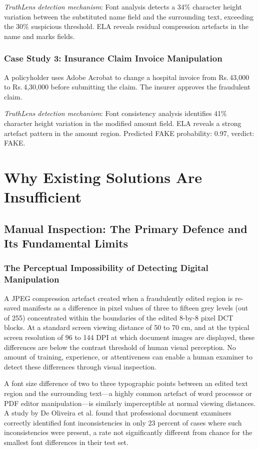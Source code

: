 \documentclass[12pt,a4paper,oneside]{report}
\newcommand{\rupee}{Rs.\,}
\begin{document}
\textit{TruthLens detection mechanism}: Font analysis detects a 34\% character
height variation between the substituted name field and the surrounding text,
exceeding the 30\% suspicious threshold. ELA reveals residual compression
artefacts in the name and marks fields.

\subsubsection*{Case Study 3: Insurance Claim Invoice Manipulation}

A policyholder uses Adobe Acrobat to change a hospital invoice from
\rupee 43,000 to \rupee 4,30,000 before submitting the claim. The insurer
approves the fraudulent claim.

\textit{TruthLens detection mechanism}: Font consistency analysis identifies
41\% character height variation in the modified amount field. ELA reveals
a strong artefact pattern in the amount region. Predicted FAKE probability:
0.97, verdict: FAKE.

\section{Why Existing Solutions Are Insufficient}

\subsection{Manual Inspection: The Primary Defence and Its Fundamental Limits}

\subsubsection*{The Perceptual Impossibility of Detecting Digital Manipulation}

A JPEG compression artefact created when a fraudulently edited region is
re-saved manifests as a difference in pixel values of three to fifteen grey
levels (out of 255) concentrated within the boundaries of the edited 8-by-8
pixel DCT blocks. At a standard screen viewing distance of 50 to 70 cm, and
at the typical screen resolution of 96 to 144 DPI at which document images
are displayed, these differences are below the contrast threshold of human
visual perception. No amount of training, experience, or attentiveness can
enable a human examiner to detect these differences through visual inspection.

A font size difference of two to three typographic points between an edited
text region and the surrounding text---a highly common artefact of word
processor or PDF editor manipulation---is similarly imperceptible at normal
viewing distances. A study by De Oliveira et al. \cite{deoliveira2016}
found that professional document examiners correctly identified font
inconsistencies in only 23 percent of cases where such inconsistencies were
present, a rate not significantly different from chance for the smallest
font differences in their test set.
\end{document}
